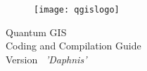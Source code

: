 
\begin{titlepage}
\begin{center}

\begin{figure}[H]
\begin{center}
\texttt{[image: qgislogo]} 
\end{center}
\end{figure}

\Huge{Quantum GIS}\\
\vspace{0.5cm}
\Large{Coding and Compilation Guide} \\
\vspace{0.5cm}
\Large{Version ~\CURRENT \textsl{'Daphnis'}}

\end{center}
\end{titlepage}
